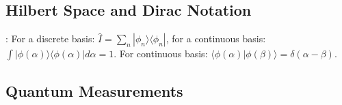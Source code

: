 
\subsection{Hilbert Space and Dirac Notation}
: For a discrete basis: $\hat{I} = \sum_n | \phi_n \rangle \langle \phi_n |$,
for a continuous basis: $\int | \phi(\alpha) \rangle \langle \phi(\alpha) | d \alpha = 1$.
For continuous basis: $\langle \phi(\alpha) | \phi(\beta) \rangle = \delta (\alpha - \beta)$.

\subsection{Quantum Measurements}


